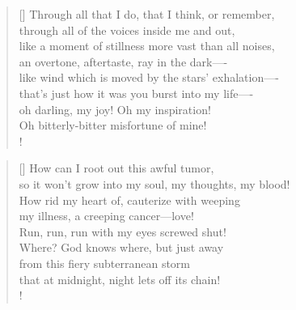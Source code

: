 \documentclass[]{article}
\begin{document}
\settowidth{\versewidth}{Through all that I do, think, or remember     }
\begin{verse}[\versewidth]
Through all that I do, that I think, or remember,\\
through all of the voices inside me and out,\\
like a moment of stillness more vast than all noises,\\
an overtone, aftertaste, ray in the dark—- \\
like wind which is moved by the stars' exhalation—- \\
that's just how it was you burst into my life—- \\
oh darling, my joy! Oh my inspiration!\\
Oh bitterly-bitter misfortune of mine!\\!
\end{verse}
\bigskip \bigskip

\settowidth{\versewidth}{How can I root out this awful tumor  }
\begin{verse}[\versewidth]
How can I root out this awful tumor,\\
so it won't grow into my soul, my thoughts, my blood!\\
How rid my heart of, cauterize with weeping\\
my illness, a creeping cancer—love!\\
Run, run, run with my eyes screwed shut!\\
Where? God knows where, but just away\\
from this fiery subterranean storm\\
that at midnight, night lets off its chain!\\!
\end{verse}
\newpage
\end{document}
